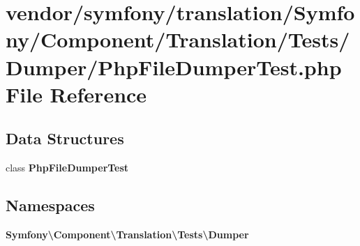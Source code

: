 \section{vendor/symfony/translation/\+Symfony/\+Component/\+Translation/\+Tests/\+Dumper/\+Php\+File\+Dumper\+Test.php File Reference}
\label{_php_file_dumper_test_8php}
\subsection*{Data Structures}
\begin{DoxyCompactItemize}
\item 
class {\bf Php\+File\+Dumper\+Test}
\end{DoxyCompactItemize}
\subsection*{Namespaces}
\begin{DoxyCompactItemize}
\item 
 {\bf Symfony\textbackslash{}\+Component\textbackslash{}\+Translation\textbackslash{}\+Tests\textbackslash{}\+Dumper}
\end{DoxyCompactItemize}
